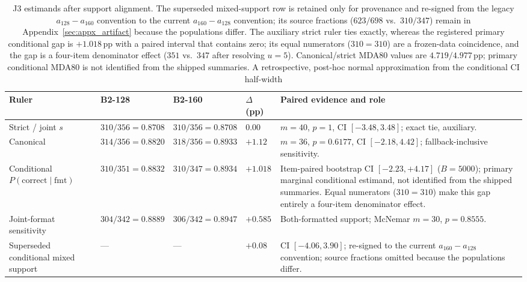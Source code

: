\documentclass{article}
\newcommand{\PcFmt}{P(\mathrm{correct}\mid\mathrm{fmt})}
\newcommand{\pp}{\,\mathrm{pp}}
\begin{document}
\begin{table}[!t]
\centering\footnotesize
\setlength{\tabcolsep}{2pt}
\begin{tabular}{@{}>{\raggedright\arraybackslash}p{2.0cm}
                    >{\raggedright\arraybackslash}p{2.4cm}
                    >{\raggedright\arraybackslash}p{2.4cm}
                    >{\raggedright\arraybackslash}p{1.35cm}
                    >{\raggedright\arraybackslash}p{5.15cm}@{}}
\toprule
Ruler & \textsc{B2-128} & \textsc{B2-160} & $\Delta$ (pp) & Paired evidence and role \\
\midrule
Strict / joint $s$ & $310/356=0.8708$ & $310/356=0.8708$ & $0.00$ &
$m{=}40$, $p{=}1$, CI $[-3.48,3.48]$; exact tie, auxiliary. \\
Canonical & $314/356=0.8820$ & $318/356=0.8933$ & $+1.12$ &
$m{=}36$, $p{=}0.6177$, CI $[-2.18,4.42]$; fallback-inclusive sensitivity. \\
Conditional $\PcFmt$ & $310/351=0.8832$ & $310/347=0.8934$ & $+1.018$ &
Item-paired bootstrap CI $[-2.23,+4.17]$ ($B{=}5000$); primary marginal
conditional estimand, not identified from the shipped summaries.  Equal
numerators ($310=310$) make this gap entirely a four-item denominator effect. \\
Joint-format sensitivity & $304/342=0.8889$ & $306/342=0.8947$ & $+0.585$ &
Both-formatted support; McNemar $m{=}30$, $p{=}0.8555$. \\
Superseded conditional mixed support & --- & --- & $+0.08$ &
CI $[-4.06,3.90]$; re-signed to the current $a_{160}-a_{128}$ convention;
source fractions omitted because the populations differ. \\
\bottomrule
\end{tabular}
\caption{J3 estimands after support alignment.  The superseded mixed-support
row is retained only for provenance and re-signed from the legacy
$a_{128}-a_{160}$ convention to the current $a_{160}-a_{128}$ convention; its
source fractions ($623/698$ vs.\ $310/347$) remain in
Appendix~\ref{sec:appx_artifact} because the
populations differ.  The auxiliary strict ruler ties exactly, whereas the
registered primary conditional gap is $+1.018\pp$ with a paired interval that
contains zero; its equal numerators ($310=310$) are a frozen-data coincidence,
and the gap is a four-item denominator effect ($351$ vs.\ $347$ after resolving
$u{=}5$).  Canonical/strict MDA80 values are $4.719/4.977\pp$; primary
conditional MDA80 is not identified from the shipped summaries.  A
retrospective, post-hoc normal approximation from the conditional CI half-width
}
\end{table}
\end{document}
